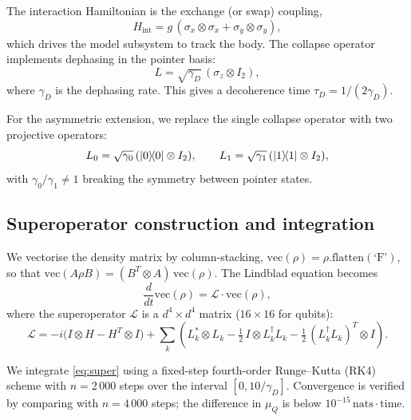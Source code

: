 \documentclass[12pt,a4paper]{article}
\newcommand{\muQ}{\mu_Q}
\newcommand{\calL}{\mathcal{L}}
\newcommand{\nats}{\,\mathrm{nats}}
\begin{document}
The interaction Hamiltonian is the exchange (or swap) coupling,
\begin{equation}\label{eq:exchange}
  H_{\mathrm{int}} = g\,(\sigma_x \otimes \sigma_x
  + \sigma_y \otimes \sigma_y),
\end{equation}
which drives the model subsystem to track the body.  The collapse
operator implements dephasing in the pointer basis:
\begin{equation}\label{eq:collapse}
  L = \sqrt{\gamma_D}\,(\sigma_z \otimes I_2),
\end{equation}
where $\gamma_D$ is the dephasing rate.  This gives a decoherence
time $\tau_D = 1/(2\gamma_D)$.

For the asymmetric extension, we replace the single collapse
operator with two projective operators:
\begin{equation}\label{eq:asym-collapse}
  L_0 = \sqrt{\gamma_0}\,(\ketbra{0}{0} \otimes I_2),
  \qquad
  L_1 = \sqrt{\gamma_1}\,(\ketbra{1}{1} \otimes I_2),
\end{equation}
with $\gamma_0 / \gamma_1 \ne 1$ breaking the symmetry between
pointer states.

\subsection{Superoperator construction and integration}

We vectorise the density matrix by column-stacking,
$\mathrm{vec}(\rho) = \rho.\mathrm{flatten}(\text{`F'})$, so that
$\mathrm{vec}(A\rho B) = (B^T \otimes A)\,\mathrm{vec}(\rho)$.
The Lindblad equation becomes
\begin{equation}\label{eq:super}
  \frac{d}{dt}\mathrm{vec}(\rho) = \calL \cdot \mathrm{vec}(\rho),
\end{equation}
where the superoperator $\calL$ is a $d^4 \times d^4$ matrix
($16 \times 16$ for qubits):
\begin{equation}\label{eq:super-explicit}
  \calL = -i\bigl(I \otimes H - H^T \otimes I\bigr)
  + \sum_k \left(
    L_k^* \otimes L_k
    - \tfrac{1}{2}\, I \otimes L_k^\dagger L_k
    - \tfrac{1}{2}\,(L_k^\dagger L_k)^T \otimes I
  \right).
\end{equation}

We integrate \eqref{eq:super} using a fixed-step fourth-order
Runge--Kutta (RK4) scheme with $n = 2\,000$ steps over the interval
$[0, 10/\gamma_D]$.  Convergence is verified by comparing with
$n = 4\,000$ steps; the difference in $\muQ$ is below $10^{-15}
\nats\!\cdot\!\mathrm{time}$.
\end{document}
